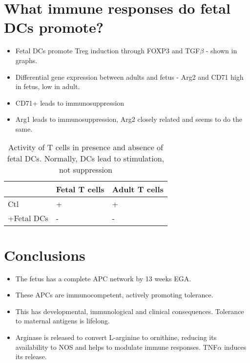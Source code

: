 \documentclass[a4paper]{article}
\begin{document}
\section{What immune responses do fetal DCs promote?}
\begin{itemize}
\item Fetal DCs promote Treg induction through FOXP3 and TGF$\beta$ - shown in graphs.

\item Differential gene expression between adults and fetus - Arg2 and CD71 high in fetus, low in adult.

\item CD71+ leads to immunosuppression \cite{pmid24196717}

\item Arg1 leads to immunosuppression, Arg2 closely related and seems to do the same.

\end{itemize}

\begin {table}[h]
\begin{center}
    \begin{tabular}{ | l | l | l |}
    \hline
 & Fetal T cells & Adult T cells \\ \hline
Ctl & + & + \\ \hline
+Fetal DCs & - & - \\
\hline
    \end{tabular}
\caption{Activity of T cells in presence and absence of fetal DCs. Normally, DCs lead to stimulation, not suppression}
\end{center}
\end {table}

\section{Conclusions}

\begin{itemize}
\item The fetus has a complete APC network by 13 weeks EGA.

\item These APCs are immunocompetent, actively promoting tolerance.

\item This has developmental, immunological and clinical consequences. Tolerance to maternal antigens is lifelong.

\item Arginase is released to convert L-arginine to ornithine, reducing its availability to NOS and helps to modulate immune responses. TNF$\alpha$ induces its release.
\end{itemize}

    
    
\end{document}
